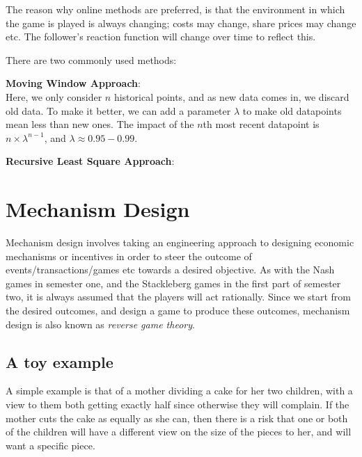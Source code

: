 The reason why online methods are preferred, is that the environment in which
the game is played is always changing; costs may change, share prices may change
etc. The follower's reaction function will change over time to reflect this.

There are two commonly used methods:

\begin{description}
  \item \textbf{Moving Window Approach}:\\
    Here, we only consider $n$ historical points, and as new data comes in, we
    discard old data.
    To make it better, we can add a parameter $\lambda$ to make old datapoints
    mean less than new ones. The impact of the $n$th most recent datapoint is
    $n \times \lambda ^{n-1}$, and $\lambda \approx 0.95-0.99$.
  \item \textbf{Recursive Least Square Approach}:\\
    
\end{description}


\section{Mechanism Design}

Mechanism design involves taking an engineering approach to designing
economic mechanisms or incentives in order to steer the outcome of
events/transactions/games etc towards a desired objective. As with the
Nash games in semester one, and the Stackleberg games in the first
part of semester two, it is always assumed that the players will act
rationally. Since we start from the desired outcomes, and design a
game to produce these outcomes, mechanism design is also known as
\textit{reverse game theory}.

\subsection{A toy example}

A simple example is that of a mother dividing a cake for her two
children, with a view to them both getting exactly half since
otherwise they will complain. If the mother cuts the cake as equally
as she can, then there is a risk that one or both of the children will
have a different view on the size of the pieces to her, and will want
a specific piece.

